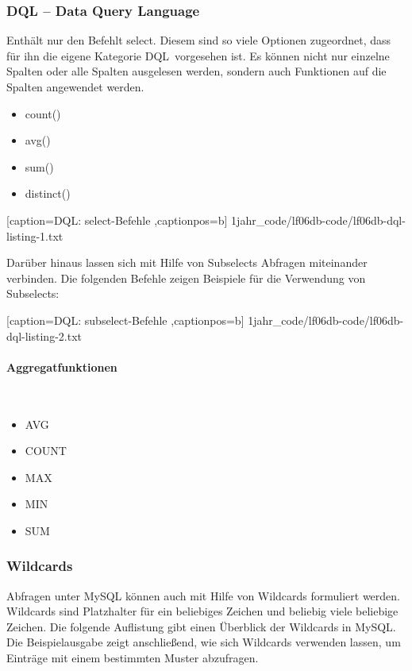 \subsubsection{DQL -- Data Query Language}
Enthält nur den Befehlt \ql select\qr. Diesem sind so viele Optionen zugeordnet, dass für ihn die eigene Kategorie \ql DQL\qr\ vorgesehen ist. Es können nicht nur einzelne Spalten oder alle Spalten ausgelesen werden, sondern auch Funktionen auf die Spalten angewendet werden.

\begin{itemize}
	\item count()
	\item avg()
	\item sum()
	\item distinct()
\end{itemize}


	[caption={DQL: select-Befehle}
	\label{lst:dql-select},captionpos=b]
	{1jahr_code/lf06db-code/lf06db-dql-listing-1.txt}

Darüber hinaus lassen sich mit Hilfe von Subselects Abfragen miteinander verbinden. Die folgenden Befehle zeigen Beispiele für die Verwendung von Subselects:


	[caption={DQL: subselect-Befehle}
	\label{lst:dql-subselect},captionpos=b]
	{1jahr_code/lf06db-code/lf06db-dql-listing-2.txt}
	
\paragraph{Aggregatfunktionen}~\\
\begin{itemize}
	\item AVG
	\item COUNT
	\item MAX
	\item MIN
	\item SUM
\end{itemize}

\subsubsection{Wildcards}

Abfragen unter MySQL können auch mit Hilfe von Wildcards formuliert werden. Wildcards sind Platzhalter für ein beliebiges Zeichen und beliebig viele beliebige Zeichen. Die folgende Auflistung gibt einen Überblick der Wildcards in MySQL. Die Beispielausgabe zeigt anschließend, wie sich Wildcards verwenden lassen, um Einträge mit einem bestimmten Muster abzufragen.

